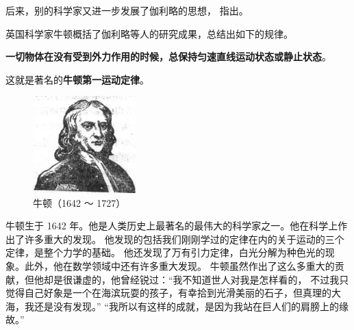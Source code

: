 后来，别的科学家又进一步发展了伽利略的思想，
指出。

英国科学家牛顿概括了伽利略等人的研究成果，总结出如下的规律。

\textbf{一切物体在没有受到外力作用的时候，总保持匀速直线运动状态或静止状态}。

这就是著名的\textbf{牛顿第一运动定律}。



\begin{figure}
    \centering
    \includegraphics[width=4cm]{../pic/czwl1-ch3-newton}
    \caption*{牛顿（1642 ～ 1727）}
\end{figure}

牛顿生于 1642 年。他是人类历史上最著名的最伟大的科学家之一。他在科学上作出了许多重大的发现。
他发现的包括我们刚刚学过的定律在内的关于运动的三个定律，是整个力学的基础。
他还发现了万有引力定律，白光分解为种色光的现象。此外，他在数学领域中还有许多重大发现。
牛顿虽然作出了这么多重大的贡献，但他却是很谦虚的，他曾经锐过：“我不知道世人对我是怎样看的，
不过我只觉得自己好象是一个在海滨玩耍的孩子，有幸拾到光滑美丽的石子，但真理的大海，我还是没有发现。”
“我所以有这样的成就，是因为我站在巨人们的肩膀上的缘故。”


